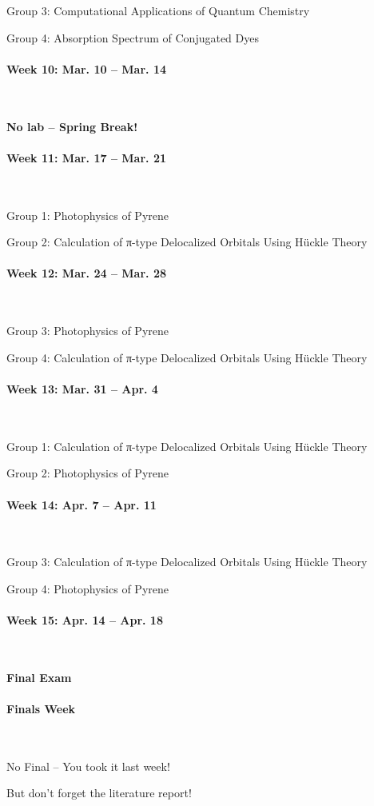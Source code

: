 \documentclass[12pt, letterpaper]{article}
\begin{document}
Group 3: Computational Applications of Quantum Chemistry

Group 4: Absorption Spectrum of Conjugated Dyes

\paragraph{Week 10: Mar. 10 -- Mar. 14}~

\textbf{No lab -- Spring Break!}

\paragraph{Week 11: Mar. 17 -- Mar. 21}~

Group 1: Photophysics of Pyrene

Group 2: Calculation of π-type Delocalized Orbitals Using Hückle Theory

\paragraph{Week 12: Mar. 24 -- Mar. 28}~

Group 3: Photophysics of Pyrene

Group 4: Calculation of π-type Delocalized Orbitals Using Hückle Theory

\paragraph{Week 13: Mar. 31 -- Apr. 4}~

Group 1: Calculation of π-type Delocalized Orbitals Using Hückle Theory

Group 2: Photophysics of Pyrene

\paragraph{Week 14: Apr. 7 -- Apr. 11}~

Group 3: Calculation of π-type Delocalized Orbitals Using Hückle Theory

Group 4: Photophysics of Pyrene

\paragraph{Week 15: Apr. 14 -- Apr. 18}~

\textbf{Final Exam}

\paragraph{Finals Week}~

No Final -- You took it last week!

But don't forget the literature report!
\end{document}
